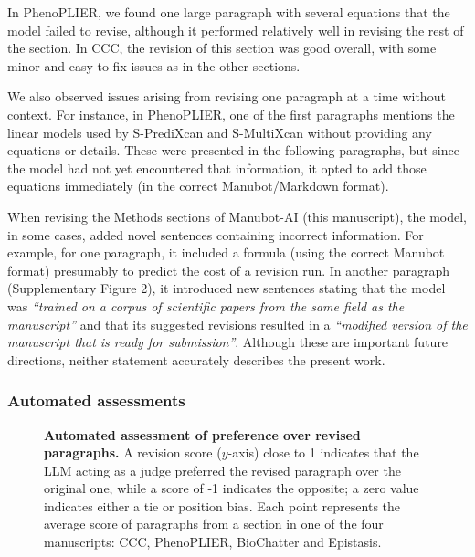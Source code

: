 \documentclass[
]{article}
\begin{document}
In PhenoPLIER, we found one large paragraph with several equations that the model failed to revise, although it performed relatively well in revising the rest of the section.
In CCC, the revision of this section was good overall, with some minor and easy-to-fix issues as in the other sections.

We also observed issues arising from revising one paragraph at a time without context.
For instance, in PhenoPLIER, one of the first paragraphs mentions the linear models used by S-PrediXcan and S-MultiXcan without providing any equations or details.
These were presented in the following paragraphs, but since the model had not yet encountered that information, it opted to add those equations immediately (in the correct Manubot/Markdown format).

% 

When revising the Methods sections of Manubot-AI (this manuscript), the model, in some cases, added novel sentences containing incorrect information.
For example, for one paragraph, it included a formula (using the correct Manubot format) presumably to predict the cost of a revision run.
In another paragraph (Supplementary Figure 2), it introduced new sentences stating that the model was \emph{``trained on a corpus of scientific papers from the same field as the manuscript''} and that its suggested revisions resulted in a \emph{``modified version of the manuscript that is ready for submission''}.
Although these are important future directions, neither statement accurately describes the present work.

\subsubsection{Automated assessments}

\begin{figure}
\hypertarget{fig:llm_judge}{%
\centering

\caption{\textbf{Automated assessment of preference over revised paragraphs.}
A revision score (\(y\)-axis) close to 1 indicates that the LLM acting as a judge preferred the revised paragraph over the original one, while a score of -1 indicates the opposite; a zero value indicates either a tie or position bias.
Each point represents the average score of paragraphs from a section in one of the four manuscripts: CCC, PhenoPLIER, BioChatter and Epistasis.}\label{fig:llm_judge}
}
\end{figure}
\end{document}
